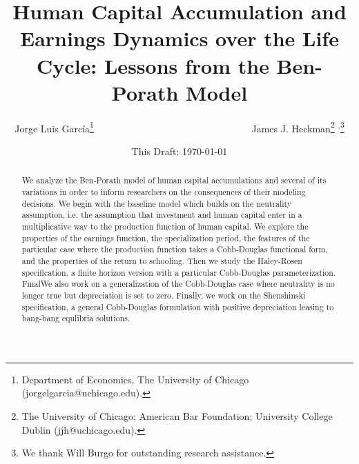


\title{Human Capital Accumulation and Earnings Dynamics over the Life Cycle: Lessons from the Ben-Porath Model}
\author{Jorge Luis Garc\'{i}a\thanks{Department of Economics, The University of Chicago (jorgelgarcia@uchicago.edu).} \ \ \ \ \ \ \ \ \ \ \ \ \ \ \ \ \ \ \ \ \ \ \
 \ \ \ \ \ \ \ \ \ James J. Heckman\thanks{The University of Chicago; American Bar Foundation; University College Dublin (jjh@uchicago.edu).} $^{,}$\thanks{We thank  Will Burgo for outstanding research assistance.}}
\date{This Draft: \today}
\maketitle


\begin{abstract}
\noindent We analyze the Ben-Porath model of human capital accumulations and several of its variations in order to inform researchers on the consequences of their modeling decisions. We begin with the baseline model which builds on the neutrality assumption, i.e. the assumption that investment and human capital enter in a multiplicative way to the production function of human capital. We explore the properties of the earnings function, the specialization period, the features of the particular case where the production function takes a Cobb-Douglas functional form, and the properties of the return to schooling. Then we study the Haley-Rosen specification, a finite horizon version with a particular Cobb-Douglas parameterization. FinalWe also work on a generalization of the Cobb-Douglas case where neutrality is no longer true but depreciation is set to zero. Finally, we work on the Shenshinski specification, a general Cobb-Douglas formulation with positive depreciation leasing to bang-bang equlibria solutions.
\end{abstract}



 

\clearpage






